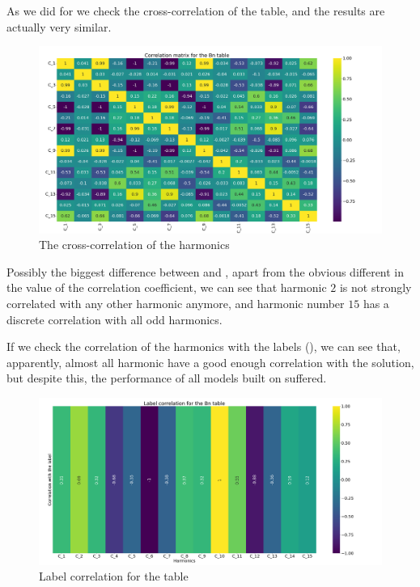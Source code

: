 As we did for \an we check the cross-correlation of the \bn table, and the results are actually very
similar.
\begin{figure}[h!]
	\centering
	\includegraphics[width=\linewidth]{img/Bn_corr_matrix.png}
	\caption{The cross-correlation of the \bn harmonics} \label{fig:bn-corr}
\end{figure}
Possibly the biggest difference between  and , apart from the
obvious different in the value of the correlation coefficient, we can see that harmonic $2$ is not
strongly correlated with any other harmonic anymore, and harmonic number $15$ has a discrete
correlation with all odd harmonics.

If we check the correlation of the harmonics with the labels (), we can see that, apparently, almost all
harmonic have a good enough correlation with the solution, but despite this, the performance of all
models built on \bn suffered.
\begin{figure}
	\centering
	\includegraphics[width=\linewidth]{img/Bn_label_corr.png}
	\caption{Label correlation for the \bn table} \label{fig:bn-lcorr}
\end{figure}

